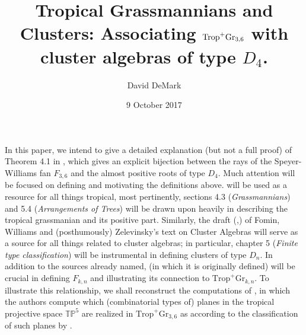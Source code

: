 \documentclass[12pt,letter]{article}
\title{Tropical Grassmannians and Clusters: Associating $\trop^+\gr_{3,6}$ with cluster algebras of type $D_4$.}
\date{9 October 2017}
\author{David DeMark}
\newcommand{\gr}{\mathrm{Gr}}
\newcommand{\trop}{\mathrm{Trop}}
\begin{document}
\maketitle
In this paper, we intend to give a detailed explanation (but not a full proof) of Theorem 4.1 in \cite{BCL16}, which gives an explicit bijection between the rays of the Speyer-Williams fan $F_{3,6}$ and the almost positive roots of type $D_4$. Much attention will be focused on defining and motivating the definitions above. \cite{MaSt15} will be used as a  resource for all things tropical, most pertinently, sections 4.3 (\emph{Grassmannians}) and 5.4 (\emph{Arrangements of Trees}) will be drawn upon heavily in describing the tropical grassmanian and its positive part. Similarly, the draft (\cite{WiFo13},\cite{WiFo45}) of Fomin, Williams and (posthumously) Zelevinsky's text on Cluster Algebras will serve as a  source for all things related to cluster algebras; in particular, chapter 5 (\emph{Finite type classification}) will be instrumental in defining clusters of type $D_n$. In addition to the sources already named, \cite{WiSp05} (in which it is originally defined) will be crucial in defining $F_{k,n}$ and illustrating its connection to $\trop^+\gr_{k,n}$. To illustrate this relationship, we shall reconstruct the computations of \cite[\S 5]{BCL16}, in which the authors compute which (combinatorial types of) planes in the tropical projective space $\mathbb{TP}^5$ are realized in $\trop^+\gr_{3,6}$ as according to the classification of such planes by \cite{He09}.
\printbibliography
\end{document}
